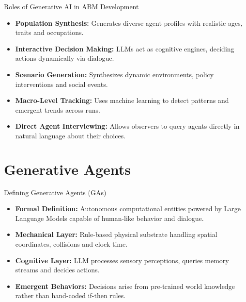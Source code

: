 \documentclass{beamer}
\begin{document}
\begin{frame}{Roles of Generative AI in ABM Development}
\begin{itemize}
    \item \textbf{Population Synthesis:} Generates diverse agent profiles with realistic ages, traits and occupations.
    \medskip
    \item \textbf{Interactive Decision Making:} LLMs act as cognitive engines, deciding actions dynamically via dialogue.
    \medskip
    \item \textbf{Scenario Generation:} Synthesizes dynamic environments, policy interventions and social events.
    \medskip
    \item \textbf{Macro-Level Tracking:} Uses machine learning to detect patterns and emergent trends across runs.
    \medskip
    \item \textbf{Direct Agent Interviewing:} Allows observers to query agents directly in natural language about their choices.
\end{itemize}
\end{frame}

\section{Generative Agents}

\begin{frame}{Defining Generative Agents (GAs)}
\begin{itemize}
    \item \textbf{Formal Definition:} Autonomous computational entities powered by Large Language Models capable of human-like behavior and dialogue.
    \medskip
    \item \textbf{Mechanical Layer:} Rule-based physical substrate handling spatial coordinates, collisions and clock time.
    \medskip
    \item \textbf{Cognitive Layer:} LLM processes sensory perceptions, queries memory streams and decides actions.
    \medskip
    \item \textbf{Emergent Behaviors:} Decisions arise from pre-trained world knowledge rather than hand-coded if-then rules.
\end{itemize}
\end{frame}
\end{document}
